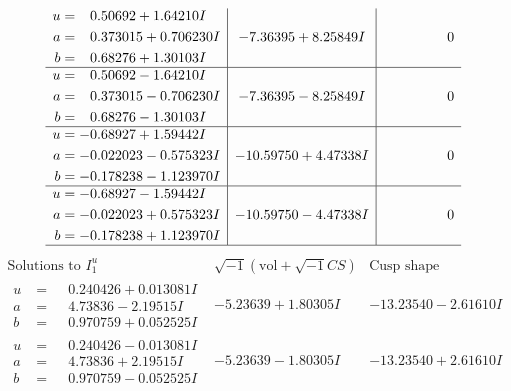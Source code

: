 \documentclass[1p]{elsarticle_modified}
\theoremstyle{definition}
\newcommand{\I}{\sqrt{-1}}
\begin{document}
$$\begin{array}{c|c|c}
\begin{aligned}
u &= \phantom{-}0.50692 + 1.64210 I \\
a &= \phantom{-}0.373015 + 0.706230 I \\
b &= \phantom{-}0.68276 + 1.30103 I\end{aligned}
 & -7.36395 + 8.25849 I & \phantom{-0.000000 } 0 \\ \hline\begin{aligned}
u &= \phantom{-}0.50692 - 1.64210 I \\
a &= \phantom{-}0.373015 - 0.706230 I \\
b &= \phantom{-}0.68276 - 1.30103 I\end{aligned}
 & -7.36395 - 8.25849 I & \phantom{-0.000000 } 0 \\ \hline\begin{aligned}
u &= -0.68927 + 1.59442 I \\
a &= -0.022023 - 0.575323 I \\
b &= -0.178238 - 1.123970 I\end{aligned}
 & -10.59750 + 4.47338 I & \phantom{-0.000000 } 0 \\ \hline\begin{aligned}
u &= -0.68927 - 1.59442 I \\
a &= -0.022023 + 0.575323 I \\
b &= -0.178238 + 1.123970 I\end{aligned}
 & -10.59750 - 4.47338 I & \phantom{-0.000000 } 0\\
 \hline 
 \end{array}$$\newpage$$\begin{array}{c|c|c}  
\text{Solutions to }I^u_{1}& \I (\text{vol} + \sqrt{-1}CS) & \text{Cusp shape}\\
 \hline 
\begin{aligned}
u &= \phantom{-}0.240426 + 0.013081 I \\
a &= \phantom{-}4.73836 - 2.19515 I \\
b &= \phantom{-}0.970759 + 0.052525 I\end{aligned}
 & -5.23639 + 1.80305 I & -13.23540 - 2.61610 I \\ \hline\begin{aligned}
u &= \phantom{-}0.240426 - 0.013081 I \\
a &= \phantom{-}4.73836 + 2.19515 I \\
b &= \phantom{-}0.970759 - 0.052525 I\end{aligned}
 & -5.23639 - 1.80305 I & -13.23540 + 2.61610 I \\ \hline\begin{aligned}

\end{aligned}
\end{array}$$
\end{document}
